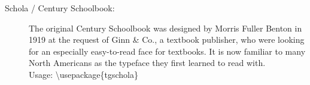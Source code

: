 \documentclass{article}
\begin{document}
\frenchspacing

\begin{description}
\item[Schola / Century Schoolbook:]
The original Century Schoolbook was designed by Morris Fuller Benton in 1919
at the request of Ginn \& Co., a textbook publisher, who were looking for an
especially easy-to-read face for textbooks.  It is now familiar to many
North Americans as the typeface they first learned to read with.\\
Usage: \textbackslash usepackage\{tgschola\}

\end{description}
\end{document}
